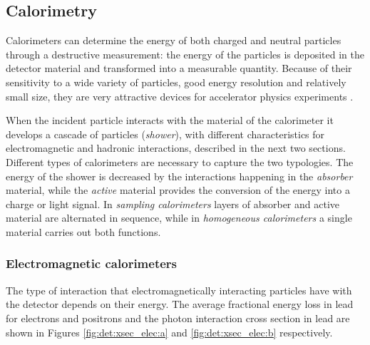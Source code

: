 \subsection{Calorimetry}
\label{sec:dec:calo}

Calorimeters can determine the energy of both charged and neutral particles through a destructive measurement: the energy of the particles is deposited in the detector material and transformed into a measurable quantity. Because of their sensitivity to a wide variety of particles, good energy resolution and relatively small size, they are very attractive devices for accelerator physics experiments \cite{RevModPhys.75.1243,Wigmans:2000vf}.

When the incident particle interacts with the material of the calorimeter it develops a cascade of particles (\textit{shower}), with different characteristics for electromagnetic and hadronic interactions, described in the next two sections. Different types of calorimeters are necessary to capture the two typologies. The energy of the shower is decreased by the interactions happening in the \textit{absorber} material, while the \textit{active} material provides the conversion of the energy into a charge or light signal. In \textit{sampling calorimeters} layers of absorber and active material are alternated in sequence, while in \textit{homogeneous calorimeters} a single material carries out both functions.


\subsubsection*{Electromagnetic calorimeters}

The type of interaction that electromagnetically interacting particles have with the detector depends on their energy. The average fractional energy loss in lead for electrons and positrons and the photon interaction cross section in lead are shown in Figures \ref{fig:det:xsec_elec:a} and \ref{fig:det:xsec_elec:b} respectively. 

